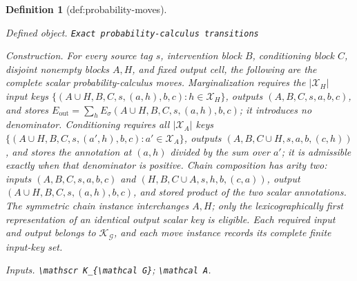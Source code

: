 \documentclass{article}
\newtheorem{definition}{Definition}
\begin{document}
\begin{definition}[def:probability-moves]\label{def:probability-moves}
\par\smallskip\noindent\emph{Defined object.} \texttt{Exact probability-\allowbreak{}calculus transitions}
\par\smallskip\noindent\emph{Construction.} For every source tag \(s\), intervention block \(B\), conditioning block \(C\), disjoint nonempty blocks \(A,H\), and fixed output cell, the following are the complete scalar probability-calculus moves. Marginalization requires the \(\lvert\mathcal X_H\rvert\) input keys \(\{(A\cup H,B,C,s,(a,h),b,c):h\in\mathcal X_H\}\), outputs \((A,B,C,s,a,b,c)\), and stores \(E_{\mathrm{out}}=\sum_hE_\sigma(A\cup H,B,C,s,(a,h),b,c)\); it introduces no denominator. Conditioning requires all \(\lvert\mathcal X_A\rvert\) keys \(\{(A\cup H,B,C,s,(a',h),b,c):a'\in\mathcal X_A\}\), outputs \((A,B,C\cup H,s,a,b,(c,h))\), and stores the annotation at \((a,h)\) divided by the sum over \(a'\); it is admissible exactly when that denominator is positive. Chain composition has arity two: inputs \((A,B,C,s,a,b,c)\) and \((H,B,C\cup A,s,h,b,(c,a))\), output \((A\cup H,B,C,s,(a,h),b,c)\), and stored product of the two scalar annotations. The symmetric chain instance interchanges \(A,H\); only the lexicographically first representation of an identical output scalar key is eligible. Each required input and output belongs to \(\mathscr K_{\mathcal G}\), and each move instance records its complete finite input-key set.
\par\smallskip\noindent\emph{Inputs.} \texttt{\textbackslash{}\allowbreak{}mathscr K\_\allowbreak{}\{\textbackslash{}\allowbreak{}mathcal G\}\allowbreak{}}; \texttt{\textbackslash{}\allowbreak{}mathcal A}.
\end{definition}
\end{document}
